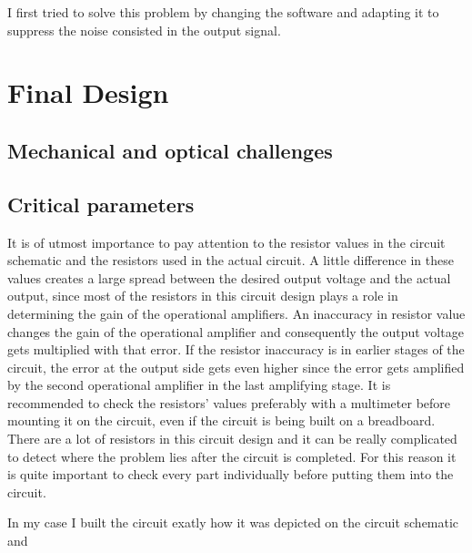 


I first tried to solve this problem by changing the software and adapting it to suppress the noise consisted in the output signal.          

\section{Final Design}
\subsection{Mechanical and optical challenges}



\subsection{Critical parameters}
\label{sub:criticalParameters}

It is of utmost importance to pay attention to the resistor values in the circuit schematic and the resistors used in the actual circuit. A little difference in these values creates a large spread between the desired output voltage and the actual output, since most of the resistors in this circuit design plays a role in determining the gain of the operational amplifiers. An inaccuracy in resistor value changes the gain of the operational amplifier and consequently the output voltage gets multiplied with that error. If the resistor inaccuracy is in earlier stages of the circuit, the error at the output side gets even higher since the error gets amplified by the second operational amplifier in the last amplifying stage. It is recommended to check the resistors' values preferably with a multimeter before mounting it on the circuit, even if the circuit is being built on a breadboard. There are a lot of resistors in this circuit design and it can be really complicated to detect where the problem lies after the circuit is completed. For this reason it is quite important to check every part individually before putting them into the circuit. \par 
In my case I built the circuit exatly how it was depicted on the circuit schematic and       